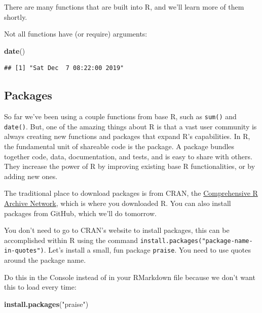 \documentclass[]{book}
\newenvironment{Shaded}{\begin{snugshade}}{\end{snugshade}}
\newcommand{\KeywordTok}[1]{\textcolor[rgb]{0.13,0.29,0.53}{\textbf{#1}}}
\newcommand{\NormalTok}[1]{#1}
\newcommand{\OperatorTok}[1]{\textcolor[rgb]{0.81,0.36,0.00}{\textbf{#1}}}
\newcommand{\StringTok}[1]{\textcolor[rgb]{0.31,0.60,0.02}{#1}}
\begin{document}
\begin{Shaded}
\end{Shaded}

There are many functions that are built into R, and we'll learn more of them shortly.

Not all functions have (or require) arguments:

\begin{Shaded}
\begin{Highlighting}[]
\KeywordTok{date}\NormalTok{()}
\end{Highlighting}
\end{Shaded}

\begin{verbatim}
## [1] "Sat Dec  7 08:22:00 2019"
\end{verbatim}

\hypertarget{packages}{%
\subsection{Packages}\label{packages}}

So far we've been using a couple functions from base R, such as \texttt{sum()} and \texttt{date()}. But, one of the amazing things about R is that a vast user community is always creating new functions and packages that expand R's capabilities. In R, the fundamental unit of shareable code is the package. A package bundles together code, data, documentation, and tests, and is easy to share with others. They increase the power of R by improving existing base R functionalities, or by adding new ones.

The traditional place to download packages is from CRAN, the \href{https://cran.r-project.org/}{Comprehensive R Archive Network}, which is where you downloaded R. You can also install packages from GitHub, which we'll do tomorrow.

You don't need to go to CRAN's website to install packages, this can be accomplished within R using the command \texttt{install.packages("package-name-in-quotes")}. Let's install a small, fun package \texttt{praise}. You need to use quotes around the package name.

Do this in the Console instead of in your RMarkdown file because we don't want this to load every time:

\begin{Shaded}
\begin{Highlighting}[]
\KeywordTok{install.packages}\NormalTok{(}\StringTok{"praise"}\NormalTok{)}
\end{Highlighting}
\end{Shaded}
\end{document}
